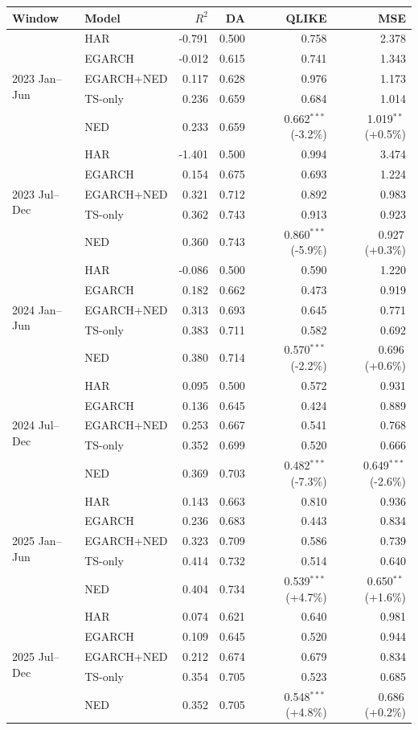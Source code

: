\begin{tabular}{@{}llrrrr@{}}
\toprule
Window & Model & $R^2$ & DA & QLIKE & MSE \\
\midrule
\multirow{5}{*}{2023 Jan--Jun} & HAR & -0.791 & 0.500 & 0.758 & 2.378 \\
 & EGARCH & -0.012 & 0.615 & 0.741 & 1.343 \\
 & EGARCH+NED & 0.117 & 0.628 & 0.976 & 1.173 \\
 & TS-only & 0.236 & 0.659 & 0.684 & 1.014 \\
 & NED & 0.233 & 0.659 & 0.662$^{***}$\,(-3.2\%) & 1.019$^{**}$\,(+0.5\%) \\
\midrule
\multirow{5}{*}{2023 Jul--Dec} & HAR & -1.401 & 0.500 & 0.994 & 3.474 \\
 & EGARCH & 0.154 & 0.675 & 0.693 & 1.224 \\
 & EGARCH+NED & 0.321 & 0.712 & 0.892 & 0.983 \\
 & TS-only & 0.362 & 0.743 & 0.913 & 0.923 \\
 & NED & 0.360 & 0.743 & 0.860$^{***}$\,(-5.9\%) & 0.927\,(+0.3\%) \\
\midrule
\multirow{5}{*}{2024 Jan--Jun} & HAR & -0.086 & 0.500 & 0.590 & 1.220 \\
 & EGARCH & 0.182 & 0.662 & 0.473 & 0.919 \\
 & EGARCH+NED & 0.313 & 0.693 & 0.645 & 0.771 \\
 & TS-only & 0.383 & 0.711 & 0.582 & 0.692 \\
 & NED & 0.380 & 0.714 & 0.570$^{***}$\,(-2.2\%) & 0.696\,(+0.6\%) \\
\midrule
\multirow{5}{*}{2024 Jul--Dec} & HAR & 0.095 & 0.500 & 0.572 & 0.931 \\
 & EGARCH & 0.136 & 0.645 & 0.424 & 0.889 \\
 & EGARCH+NED & 0.253 & 0.667 & 0.541 & 0.768 \\
 & TS-only & 0.352 & 0.699 & 0.520 & 0.666 \\
 & NED & 0.369 & 0.703 & 0.482$^{***}$\,(-7.3\%) & 0.649$^{***}$\,(-2.6\%) \\
\midrule
\multirow{5}{*}{2025 Jan--Jun} & HAR & 0.143 & 0.663 & 0.810 & 0.936 \\
 & EGARCH & 0.236 & 0.683 & 0.443 & 0.834 \\
 & EGARCH+NED & 0.323 & 0.709 & 0.586 & 0.739 \\
 & TS-only & 0.414 & 0.732 & 0.514 & 0.640 \\
 & NED & 0.404 & 0.734 & 0.539$^{***}$\,(+4.7\%) & 0.650$^{**}$\,(+1.6\%) \\
\midrule
\multirow{5}{*}{2025 Jul--Dec} & HAR & 0.074 & 0.621 & 0.640 & 0.981 \\
 & EGARCH & 0.109 & 0.645 & 0.520 & 0.944 \\
 & EGARCH+NED & 0.212 & 0.674 & 0.679 & 0.834 \\
 & TS-only & 0.354 & 0.705 & 0.523 & 0.685 \\
 & NED & 0.352 & 0.705 & 0.548$^{***}$\,(+4.8\%) & 0.686\,(+0.2\%) \\
\bottomrule
\end{tabular}
